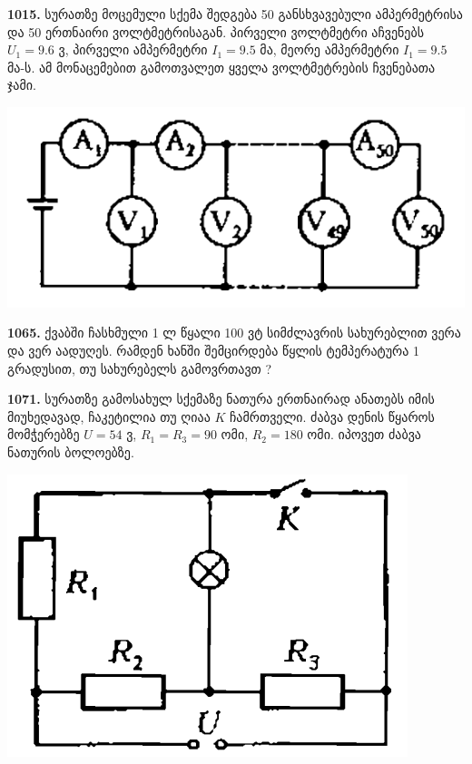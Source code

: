 \documentclass[12pt,a4paper,]{report}
\begin{document}
\textbf{1015.} სურათზე მოცემული სქემა შედგება 50 განსხვავებული ამპერმეტრისა და 50 ერთნაირი ვოლტმეტრისაგან. პირველი ვოლტმეტრი აჩვენებს $U_1=9.6$ ვ, პირველი ამპერმეტრი $I_1=9.5$ მა, მეორე ამპერმეტრი $I_1=9.5$ მა-ს. ამ მონაცემებით გამოთვალეთ ყველა ვოლტმეტრების ჩვენებათა ჯამი. 
		\begin{center}
			\includegraphics[scale=0.4]{images/1015.png}
		\end{center}

\textbf{1065.} ქვაბში ჩასხმული 1 ლ წყალი 100 ვტ სიმძლავრის სახურებლით ვერა და ვერ აადუღეს. რამდენ ხანში შემცირდება წყლის ტემპერატურა 1 გრადუსით, თუ სახურებელს გამოვრთავთ ?

\textbf{1071.} სურათზე გამოსახულ სქემაზე ნათურა ერთნაირად ანათებს იმის მიუხედავად, ჩაკეტილია თუ ღიაა $K$ ჩამრთველი. ძაბვა დენის წყაროს მომჭერებზე $U=54$ ვ, $R_1=R_3=90$ ომი, $R_2=180$ ომი. იპოვეთ ძაბვა ნათურის ბოლოებზე.
		\begin{center}
			\includegraphics[scale=0.3]{images/F1071.png}
		\end{center}
	
\end{document}
